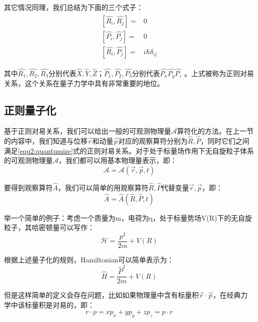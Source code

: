         其它情况同理，我们总结为下面的三个式子：
        \begin{align}\label{equ2:quantumize}
            \begin{split}
                [\hat{R_i},\hat{R_j}]=&0\\
                [\hat{P_i},\hat{P_j}]=&0\\
                [\hat{R_i},\hat{P_j}]=&i\hbar\delta_{ij}
            \end{split}
        \end{align}
        
        其中$\hat{R_1},\hat{R_2},\hat{R_3}$分别代表$\hat{X},\hat{Y},\hat{Z}$；$\hat{P_1},\hat{P_2},\hat{P_3}$分别代表$\hat{P_x}\hat{P_y}\hat{P_z}$ 。上式被称为正则对易关系，这个关系在量子力学中具有非常重要的地位。
    \subsection{正则量子化}
    基于正则对易关系，我们可以给出一般的可观测物理量$\mathscr{A}$算符化的方法。在上一节的内容中，我们知道与位移$\Vec{r}$和动量$\Vec{p}$对应的观察算符分别为$\hat{R},\hat{P}$，同时它们之间满足\eqref{equ2:quantumize}式的正则对易关系。对于处于标量场作用下无自旋粒子体系的可观测物理量$\mathscr{A}$，我们都可以用基本物理量表示，即：
    \begin{equation}
        \mathscr{A}=\mathscr{A}(\Vec{r},\Vec{p},t)
    \end{equation}
    
    要得到观察算符$\hat{A}$，我们可以简单的用观察算符$\hat{R},\hat{P}$代替变量$\Vec{r},\Vec{p}$，即：
    \begin{equation}
        \hat{A}=\hat{A}(\hat{R},\hat{P},t)
    \end{equation}
    
    举一个简单的例子：考虑一个质量为m，电荷为q，处于标量势场V(R)下的无自旋粒子，其哈密顿量可以写作：
    \begin{equation}
        \mathscr{H}=\frac{p^2}{2m}+V(R)
    \end{equation}
    
    根据上述量子化的规则，Hamiltonian可以简单表示为：
    \begin{equation}
        \hat{H}=\frac{\hat{P}^2}{2m}+V(R)
    \end{equation}
    
    但是这样简单的定义会存在问题，比如如果物理量中含有标量积$\Vec{r}\cdot \Vec{p}$，在经典力学中该标量积是对易的，即：
    \begin{equation}
        r\cdot p=xp_x+yp_y+zp_z=p\cdot r
    \end{equation}
    
